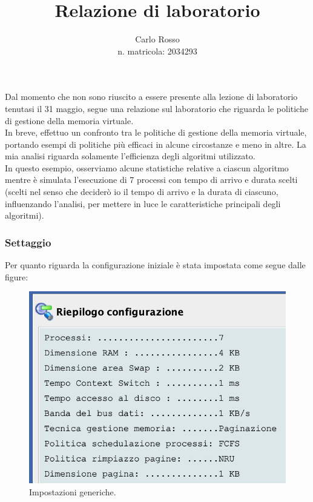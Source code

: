 \documentclass[12px]{article}
\title{Relazione di laboratorio}
\author{Carlo Rosso \\ n. matricola: 2034293}
\begin{document}
\begin{titlepage}
	\maketitle
	\thispagestyle{empty}
\end{titlepage}

Dal momento che non sono riuscito a essere presente alla lezione di laboratorio tenutasi il 31 maggio, segue una relazione sul laboratorio che riguarda le politiche di gestione della memoria virtuale.\\

In breve, effettuo un confronto tra le politiche di gestione della memoria virtuale, portando esempi di politiche più efficaci in alcune circostanze e meno in altre. La mia analisi riguarda solamente l'efficienza degli algoritmi utilizzato.\\
In questo esempio, osserviamo alcune statistiche relative a ciascun algoritmo mentre è simulata l'esecuzione di 7 processi con tempo di arrivo e durata scelti (scelti nel senso che deciderò io il tempo di arrivo e la durata di ciascuno, influenzando l'analisi, per mettere in luce le caratteristiche principali degli algoritmi).

\subsubsection{Settaggio}
Per quanto riguarda la configurazione iniziale è stata impostata come segue dalle figure:
\begin{figure}[h]
	\centering
	\includegraphics[scale=0.3]{img/impostazioni}
	\caption{Impostazioni generiche.}
\end{figure}
\end{document}
